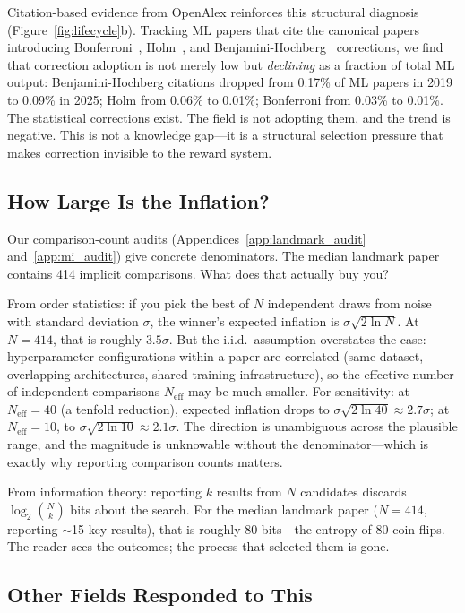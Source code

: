 \documentclass{article}
\begin{document}
Citation-based evidence from OpenAlex reinforces this structural diagnosis (Figure~\ref{fig:lifecycle}b). Tracking ML papers that cite the canonical papers introducing Bonferroni~\citep{dunn_1961}, Holm~\citep{holm_1979}, and Benjamini-Hochberg~\citep{benjamini_hochberg_1995} corrections, we find that correction adoption is not merely low but \emph{declining} as a fraction of total ML output: Benjamini-Hochberg citations dropped from 0.17\% of ML papers in 2019 to 0.09\% in 2025; Holm from 0.06\% to 0.01\%; Bonferroni from 0.03\% to 0.01\%. The statistical corrections exist. The field is not adopting them, and the trend is negative. This is not a knowledge gap---it is a structural selection pressure that makes correction invisible to the reward system.

\subsection{How Large Is the Inflation?}

Our comparison-count audits (Appendices~\ref{app:landmark_audit} and~\ref{app:mi_audit}) give concrete denominators. The median landmark paper contains 414 implicit comparisons. What does that actually buy you?

From order statistics: if you pick the best of $N$ independent draws from noise with standard deviation $\sigma$, the winner's expected inflation is $\sigma\sqrt{2 \ln N}$. At $N = 414$, that is roughly $3.5\sigma$. But the i.i.d.\ assumption overstates the case: hyperparameter configurations within a paper are correlated (same dataset, overlapping architectures, shared training infrastructure), so the effective number of independent comparisons $N_{\text{eff}}$ may be much smaller. For sensitivity: at $N_{\text{eff}} = 40$ (a tenfold reduction), expected inflation drops to $\sigma\sqrt{2 \ln 40} \approx 2.7\sigma$; at $N_{\text{eff}} = 10$, to $\sigma\sqrt{2 \ln 10} \approx 2.1\sigma$. The direction is unambiguous across the plausible range, and the magnitude is unknowable without the denominator---which is exactly why reporting comparison counts matters.

From information theory: reporting $k$ results from $N$ candidates discards $\log_2\binom{N}{k}$ bits about the search. For the median landmark paper ($N = 414$, reporting $\sim$15 key results), that is roughly 80 bits---the entropy of 80 coin flips. The reader sees the outcomes; the process that selected them is gone.

\subsection{Other Fields Responded to This}
\end{document}
